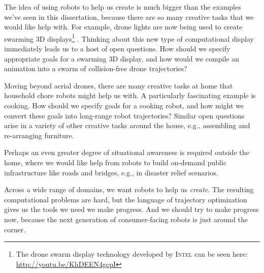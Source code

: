 The idea of using robots to help us create is much bigger than the examples we've seen in this dissertation, because there are so many creative tasks that we would like help with.
For example, drone lights are now being used to create swarming 3D displays\footnote{The drone swarm display technology developed by \textsc{Intel} can be seen here: \url{http://youtu.be/KhDEEN4gcpI}} \cite{intel:2018}.
Thinking about this new type of computational display immediately leads us to a host of open questions.
How should we specify appropriate goals for a swarming 3D display, and how would we compile an animation into a swarm of collision-free drone trajectories?

Moving beyond aerial drones, there are many creative tasks at home that household chore robots might help us with.
A particularly fascinating example is cooking. 
How should we specify goals for a cooking robot, and how might we convert these goals into long-range robot trajectories?
Similar open questions arise in a variety of other creative tasks around the house, e.g., assembling and re-arranging furniture.

Perhaps an even greater degree of situational awareness is required outside the home, where we would like help from robots to build on-demand public infrastructure like roads and bridges, e.g., in disaster relief scenarios.

Across a wide range of domains, we want robots to help us \emph{create}.
The resulting computational problems are hard, but the language of trajectory optimization gives us the tools we need we make progress.
And we should try to make progress now, because the next generation of consumer-facing robots is just around the corner.
